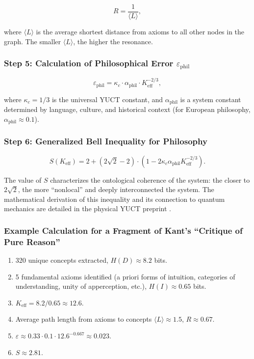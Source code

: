 \documentclass[12pt,a4paper]{article}
\newcommand{\kappac}{\kappa_c}
\newcommand{\eps}{\varepsilon}
\begin{document}
	\[
	R = \frac{1}{\langle L \rangle},
	\]
	
	where \(\langle L \rangle\) is the average shortest distance from axioms to all other nodes in the graph. The smaller \(\langle L \rangle\), the higher the resonance.
	
	\subsubsection{Step 5: Calculation of Philosophical Error \(\eps_{\text{phil}}\)}
	
	\[
	\eps_{\text{phil}} = \kappac \cdot \alpha_{\text{phil}} \cdot K_{\mathrm{eff}}^{-2/3},
	\]
	
	where \(\kappac = 1/3\) is the universal YUCT constant, and \(\alpha_{\text{phil}}\) is a system constant determined by language, culture, and historical context (for European philosophy, \(\alpha_{\text{phil}} \approx 0.1\)).
	
	\subsubsection{Step 6: Generalized Bell Inequality for Philosophy}
	
	\[
	S(K_{\mathrm{eff}}) = 2 + (2\sqrt{2} - 2) \cdot \left(1 - 2\kappac \alpha_{\text{phil}} K_{\mathrm{eff}}^{-2/3}\right).
	\]
	
	The value of \(S\) characterizes the ontological coherence of the system: the closer to \(2\sqrt{2}\), the more ``nonlocal'' and deeply interconnected the system. The mathematical derivation of this inequality and its connection to quantum mechanics are detailed in the physical YUCT preprint \cite{Yakushev2026b}.
	
	\subsubsection{Example Calculation for a Fragment of Kant's ``Critique of Pure Reason''}
	
	\begin{enumerate}
		\item 320 unique concepts extracted, \(H(D) \approx 8.2\) bits.
		\item 5 fundamental axioms identified (a priori forms of intuition, categories of understanding, unity of apperception, etc.), \(H(I) \approx 0.65\) bits.
		\item \(K_{\mathrm{eff}} = 8.2 / 0.65 \approx 12.6\).
		\item Average path length from axioms to concepts \(\langle L \rangle \approx 1.5\), \(R \approx 0.67\).
		\item \(\eps \approx 0.33 \cdot 0.1 \cdot 12.6^{-0.667} \approx 0.023\).
		\item \(S \approx 2.81\).
	\end{enumerate}
	
\end{document}
